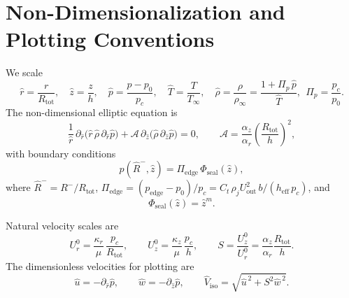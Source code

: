 \documentclass[11pt,a4paper]{article}
\begin{document}
\section{Non-Dimensionalization and Plotting Conventions}
We scale
\begin{equation}
  \hat r=\frac{r}{R_{\mathrm{tot}}},\quad
  \hat z=\frac{z}{h},\quad
  \hat p=\frac{p-p_0}{p_c},\quad
  \hat T=\frac{T}{T_\infty},\quad
  \hat\rho=\frac{\rho}{\rho_\infty}=\frac{1+\Pi_p\,\hat p}{\hat T},\ \ \Pi_p=\frac{p_c}{p_0}.
\end{equation}
The non-dimensional elliptic equation is
\begin{equation}
  \frac{1}{\hat r}\,\partial_{\hat r}\!\big(\hat r\,\hat\rho\,\partial_{\hat r}\hat p\big)
  + \mathcal{A}\,\partial_{\hat z}\!\big(\hat\rho\,\partial_{\hat z}\hat p\big)=0,
  \qquad
  \mathcal{A}=\frac{\alpha_z}{\alpha_r}\left(\frac{R_{\mathrm{tot}}}{h}\right)^2,
\end{equation}
with boundary conditions
\begin{equation}
  \hat p(\hat R^{-},\hat z)=\Pi_{\mathrm{edge}}\, \Phi_{\mathrm{seal}}(\hat z),
\end{equation}
where $\hat R^{-}=R^{-}/R_{\mathrm{tot}}$, $\Pi_{\mathrm{edge}}=(p_{\mathrm{edge}}-p_0)/p_c
= C_t\,\rho_j U_{\mathrm{out}}^2\,b/(h_{\mathrm{eff}}\,p_c)$, and
\begin{equation}
  \Phi_{\mathrm{seal}}(\hat z)=\hat z^{m}.
\end{equation}


Natural velocity scales are
\begin{equation}
  U_r^0=\frac{\kappa_r}{\mu}\,\frac{p_c}{R_{\mathrm{tot}}},\qquad
  U_z^0=\frac{\kappa_z}{\mu}\,\frac{p_c}{h},\qquad
  S=\frac{U_z^0}{U_r^0}=\frac{\alpha_z}{\alpha_r}\frac{R_{\mathrm{tot}}}{h}.
\end{equation}
The dimensionless velocities for plotting are
\begin{equation}
  \hat u=-\partial_{\hat r}\hat p,\qquad
  \hat w=-\partial_{\hat z}\hat p,\qquad
  \hat V_{\mathrm{iso}}=\sqrt{\hat u^{\,2}+S^{2}\hat w^{\,2}}.
\end{equation}
\end{document}
